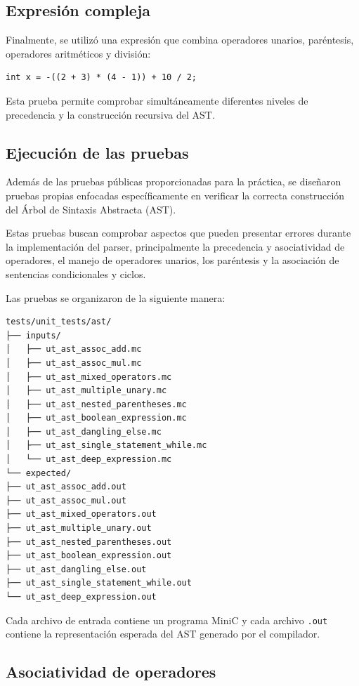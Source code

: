 \documentclass[12pt,letterpaper]{article}
\begin{document}
\subsection*{Expresión compleja}

Finalmente, se utilizó una expresión que combina operadores unarios, paréntesis, operadores aritméticos y división:

\begin{verbatim}
int x = -((2 + 3) * (4 - 1)) + 10 / 2;
\end{verbatim}

Esta prueba permite comprobar simultáneamente diferentes niveles de precedencia y la construcción recursiva del AST.

\subsection*{Ejecución de las pruebas}
Además de las pruebas públicas proporcionadas para la práctica, se diseñaron pruebas propias enfocadas específicamente en verificar la correcta construcción del Árbol de Sintaxis Abstracta (AST).

Estas pruebas buscan comprobar aspectos que pueden presentar errores durante la implementación del parser, principalmente la precedencia y asociatividad de operadores, el manejo de operadores unarios, los paréntesis y la asociación de sentencias condicionales y ciclos.

Las pruebas se organizaron de la siguiente manera:

\begin{verbatim}
tests/unit_tests/ast/
├── inputs/
│   ├── ut_ast_assoc_add.mc
│   ├── ut_ast_assoc_mul.mc
│   ├── ut_ast_mixed_operators.mc
│   ├── ut_ast_multiple_unary.mc
│   ├── ut_ast_nested_parentheses.mc
│   ├── ut_ast_boolean_expression.mc
│   ├── ut_ast_dangling_else.mc
│   ├── ut_ast_single_statement_while.mc
│   └── ut_ast_deep_expression.mc
└── expected/
├── ut_ast_assoc_add.out
├── ut_ast_assoc_mul.out
├── ut_ast_mixed_operators.out
├── ut_ast_multiple_unary.out
├── ut_ast_nested_parentheses.out
├── ut_ast_boolean_expression.out
├── ut_ast_dangling_else.out
├── ut_ast_single_statement_while.out
└── ut_ast_deep_expression.out
\end{verbatim}

Cada archivo de entrada contiene un programa MiniC y cada archivo \texttt{.out} contiene la representación esperada del AST generado por el compilador.

\subsection*{Asociatividad de operadores}
\end{document}
